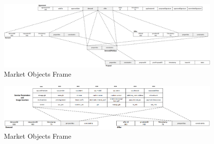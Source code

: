 \begin{figure}[H]
    \centering
    \includegraphics[width=18cm,angle=0]{./diag/Reference/MarketFrame-1-Reference.png}
	\caption{Market Objects Frame}
    \label{fig:MF1}
\end{figure}


\begin{figure}[H]
    \centering
    \includegraphics[width=16cm,angle=0]{./diag/Reference/MarketFrame-2-Reference.png}
	\caption{Market Objects Frame}
    \label{fig:MF2}
\end{figure}

